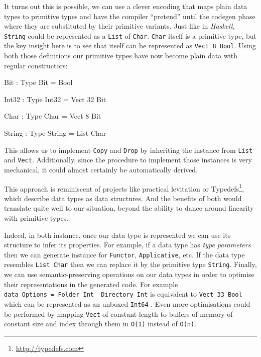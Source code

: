 \documentclass[
]{article}
\newenvironment{Shaded}{}{}
\newcommand{\DataTypeTok}[1]{\textcolor[rgb]{0.56,0.13,0.00}{#1}}
\newcommand{\DecValTok}[1]{\textcolor[rgb]{0.25,0.63,0.44}{#1}}
\newcommand{\OperatorTok}[1]{\textcolor[rgb]{0.40,0.40,0.40}{#1}}
\newcommand{\OtherTok}[1]{\textcolor[rgb]{0.00,0.44,0.13}{#1}}
\begin{document}
It turns out this is possible, we can use a clever encoding that maps
plain data types to primitive types and have the compiler ``pretend''
until the codegen phase where they are substituted by their primitive
variants. Just like in \emph{Haskell}, \texttt{String} could be
represented as a \texttt{List} of \texttt{Char}. \texttt{Char} itself is
a primitive type, but the key insight here is to see that itself can be
represented as \texttt{Vect\ 8\ Bool}. Using both those definitions our
primitive types have now become plain data with regular constructors:

\begin{Shaded}
\begin{Highlighting}[]
\DataTypeTok{Bit} \OperatorTok{:} \DataTypeTok{Type}
\DataTypeTok{Bit} \OtherTok{=} \DataTypeTok{Bool}

\DataTypeTok{Int32} \OperatorTok{:} \DataTypeTok{Type}
\DataTypeTok{Int32} \OtherTok{=} \DataTypeTok{Vect} \DecValTok{32} \DataTypeTok{Bit}

\DataTypeTok{Char} \OperatorTok{:} \DataTypeTok{Type}
\DataTypeTok{Char} \OtherTok{=} \DataTypeTok{Vect} \DecValTok{8} \DataTypeTok{Bit}

\DataTypeTok{String} \OperatorTok{:} \DataTypeTok{Type}
\DataTypeTok{String} \OtherTok{=} \DataTypeTok{List} \DataTypeTok{Char}
\end{Highlighting}
\end{Shaded}

This allows us to implement \texttt{Copy} and \texttt{Drop} by
inheriting the instance from \texttt{List} and \texttt{Vect}.
Additionally, since the procedure to implement those instances is very
mechanical, it could almost certainly be automatically derived.

This approach is reminiscent of projects like practical
levitation\cite{practical_levitation} or Typedefs\footnote{\url{http://typedefs.com}},
which describe data types as data structures. And the benefits of both
would translate quite well to our situation, beyond the ability to dance
around linearity with primitive types.

Indeed, in both instance, once our data type is represented we can use
its structure to infer its properties. For example, if a data type has
\emph{type parameters} then we can generate instance for
\texttt{Functor}, \texttt{Applicative}, etc. If the data type resembles
\texttt{List\ Char} then we can replace it by the primitive type
\texttt{String}. Finally, we can use semantic-preserving operations on
our data types in order to optimise their representations in the
generated code. For example
\texttt{data\ Options\ =\ Folder\ Int\ \textbar{}\ Directory\ Int} is
equivalent to \texttt{Vect\ 33\ Bool} which can be represented as an
unboxed \texttt{Int64} . Even more optimisations could be performed by
mapping \texttt{Vect} of constant length to buffers of memory of
constant size and index through them in \texttt{O(1)} instead of
\texttt{O(n)}.
\end{document}
